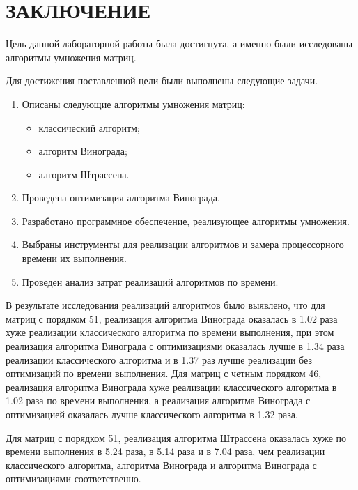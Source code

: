 \chapter*{ЗАКЛЮЧЕНИЕ}

Цель данной лабораторной работы была достигнута, а именно были исследованы алгоритмы умножения матриц.


Для достижения поставленной цели были выполнены следующие задачи.
\begin{enumerate}
	\item Описаны следующие алгоритмы умножения матриц:
	\begin{itemize}
		\item классический алгоритм;
		\item алгоритм Винограда;
		\item алгоритм Штрассена.
	\end{itemize}
	\item Проведена оптимизация алгоритма Винограда.
	\item Разработано программное обеспечение, реализующее алгоритмы умножения.
	\item Выбраны инструменты для реализации алгоритмов и замера процессорного времени их выполнения.
	\item Проведен анализ затрат реализаций алгоритмов по времени. 
\end{enumerate}

В результате исследования реализаций алгоритмов было выявлено, что для матриц с порядком 51, реализация алгоритма Винограда оказалась в 1.02 раза хуже реализации классического алгоритма по времени выполнения, при этом реализация алгоритма Винограда с оптимизациями оказалась лучше в 1.34 раза реализации классического алгоритма и в 1.37 раз лучше реализации без оптимизаций по времени выполнения. 
Для матриц с четным порядком 46, реализация алгоритма Винограда хуже реализации классического алгоритма в 1.02 раза по времени выполнения, а реализация алгоритма Винограда с оптимизацией оказалась лучше классического алгоритма в 1.32 раза. 

Для матриц с порядком 51, реализация алгоритма Штрассена оказалась хуже по времени выполнения в 5.24 раза, в 5.14 раза и в 7.04 раза, чем реализации классического алгоритма, алгоритма Винограда и алгоритма Винограда с оптимизациями соответственно. 